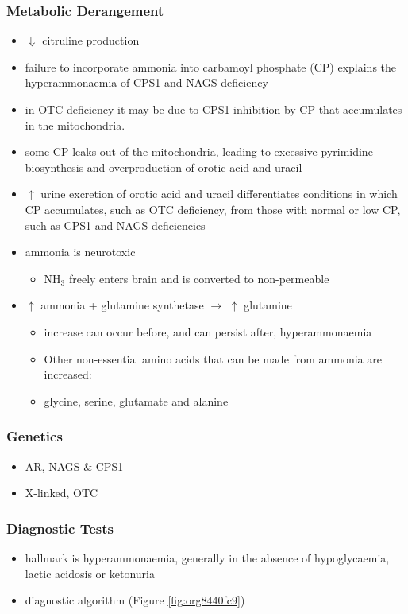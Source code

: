 \documentclass{scrartcl}
\begin{document}
\subsubsection{Metabolic Derangement}
\label{sec:orgb3206a7}
\begin{itemize}
\item \(\Downarrow\) citruline production
\item failure to incorporate ammonia into carbamoyl phosphate (CP)
explains the hyperammonaemia of CPS1 and NAGS deficiency
\item in OTC deficiency it may be due to CPS1 inhibition by CP
that accumulates in the mitochondria.
\item some CP leaks out of the mitochondria, leading to excessive
pyrimidine biosynthesis and overproduction of orotic acid and
uracil
\item \(\uparrow\) urine excretion of orotic acid and uracil differentiates
conditions in which CP accumulates, such as OTC deficiency, from
those with normal or low CP, such as CPS1 and NAGS deficiencies
\item ammonia is neurotoxic
\begin{itemize}
\item NH\(_{\text{3}}\) freely enters brain and is converted to non-permeable
\end{itemize}
\item \(\uparrow\) ammonia + glutamine synthetase \(\to\) \(\uparrow\) glutamine
\begin{itemize}
\item increase can occur before, and can persist after, hyperammonaemia
\item Other non-essential amino acids that can be made from ammonia are increased:
\item glycine, serine, glutamate and alanine
\end{itemize}
\end{itemize}

\subsubsection{Genetics}
\label{sec:org4e33394}
\begin{itemize}
\item AR, NAGS \& CPS1
\item X-linked, OTC
\end{itemize}

\subsubsection{Diagnostic Tests}
\label{sec:org2cb783e}
\begin{itemize}
\item hallmark is hyperammonaemia, generally in the absence of
hypoglycaemia, lactic acidosis or ketonuria
\item diagnostic algorithm (Figure \ref{fig:org8440fc9})
\end{itemize}
\end{document}
